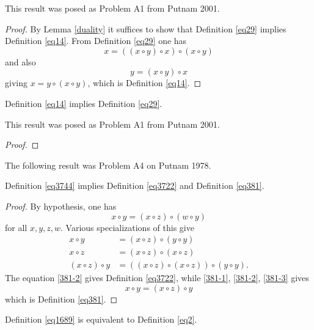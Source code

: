 This result was posed as Problem A1 from Putnam 2001.

\begin{proof}\leanok{} By Lemma \ref{duality} it suffices to show that Definition \ref{eq29} implies Definition \ref{eq14}.  From Definition \ref{eq29} one has
  $$ x = ((x \circ y) \circ x) \circ (x \circ y)$$
  and also
  $$ y = (x \circ y) \circ x$$
  giving $x = y \circ (x \circ y)$, which is Definition \ref{eq14}.
\end{proof}

\begin{theorem}[14 implies 29]\label{14_implies_29} \leanok  Definition \ref{eq14} implies Definition \ref{eq29}.
\end{theorem}

This result was posed as Problem A1 from Putnam 2001.

\begin{proof}\leanok
\end{proof}

The following result was Problem A4 on Putnam 1978.

\begin{theorem}[3744 implies 3722, 381]\label{3744_implies_3722_381} Definition \ref{eq3744} implies Definition \ref{eq3722} and Definition \ref{eq381}.
\end{theorem}

\begin{proof} By hypothesis, one has
$$x \circ y = (x \circ z) \circ (w \circ y)
  $$
for all $x,y,z,w$.  Various specializations of this give
\begin{align}
 x \circ y &= (x \circ z) \circ (y \circ y) \label{381-1} \\
 x \circ z &= (x \circ z) \circ (x \circ z) \label{381-2} \\
(x \circ z) \circ y &= ((x \circ z) \circ (x \circ z)) \circ (y \circ y) \label{381-3}.
\end{align}
The equation \eqref{381-2} gives Definition \ref{eq3722}, while \eqref{381-1}, \eqref{381-2}, \eqref{381-3} gives
$$ x \circ y = (x\circ z) \circ y$$
which is Definition \ref{eq381}.
\end{proof}

\begin{theorem}[1689 is equivalent to 2]\label{1689_equiv_2} Definition \ref{eq1689} is equivalent to Definition \ref{eq2}.
\end{theorem}


